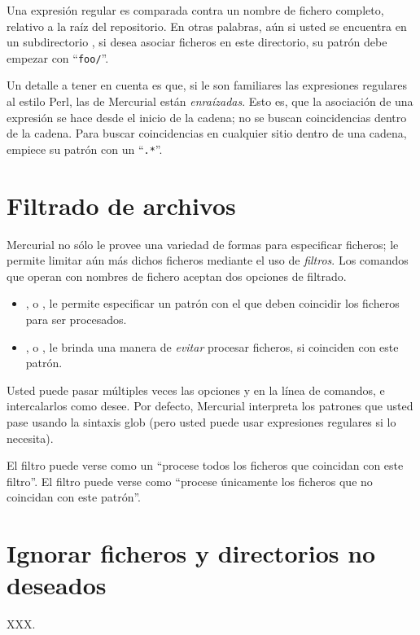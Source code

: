 Una expresión regular es comparada contra un nombre de fichero
completo, relativo a la raíz del repositorio. En otras palabras, aún
si usted se encuentra en un subdirectorio , si desea
asociar ficheros en este directorio, su patrón debe empezar con
``\texttt{foo/}''.

Un detalle a tener en cuenta es que, si le son familiares las
expresiones regulares al estilo Perl, las de Mercurial están
\emph{enraízadas}. Esto es, que la asociación de una expresión se hace
desde el inicio de la cadena; no se buscan coincidencias dentro de la
cadena. Para buscar coincidencias en cualquier sitio dentro de una
cadena, empiece su patrón con un ``\texttt{.*}''.

\section{Filtrado de archivos}

Mercurial no sólo le provee una variedad de formas para especificar
ficheros; le permite limitar aún más dichos ficheros mediante el uso
de \emph{filtros}. Los comandos que operan con nombres de fichero
aceptan dos opciones de filtrado.
\begin{itemize}
\item {}, o , le permite especificar un
    patrón con el que deben coincidir los ficheros para ser
    procesados.
\item {}, o , le brinda una manera de 
  \emph{evitar} procesar ficheros, si coinciden con este patrón.
\end{itemize}
Usted puede pasar múltiples veces las opciones  y
 en la línea de comandos, e intercalarlos como desee.
Por defecto, Mercurial interpreta los patrones que usted pase usando
la sintaxis glob (pero usted puede usar expresiones regulares si lo
necesita).

El filtro  puede verse como un ``procese todos los ficheros
que coincidan con este filtro''.
El filtro  puede verse como ``procese únicamente los
ficheros que no coincidan con este patrón''.

\section{Ignorar ficheros y directorios no deseados}

XXX.

